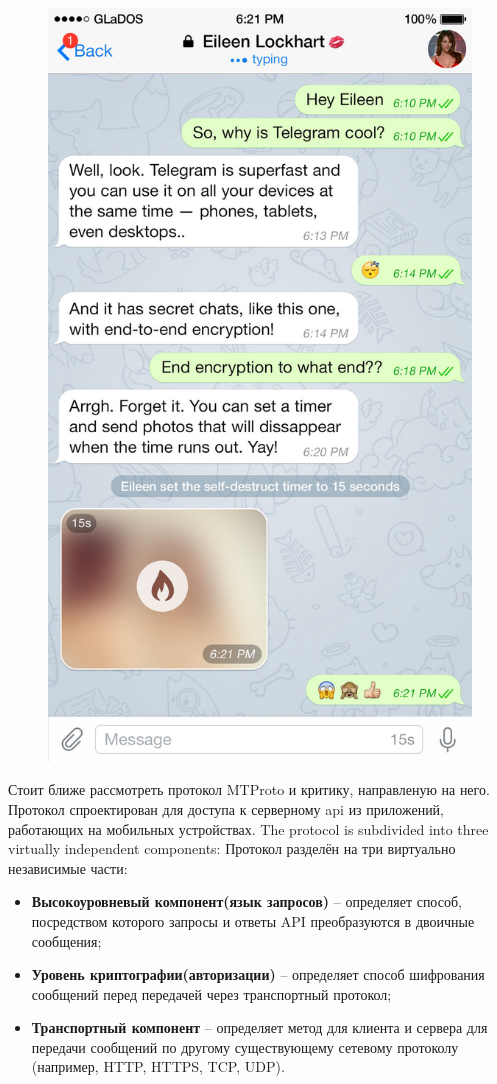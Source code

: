 \begin{figure}[h]
\begin{minipage}{.5\textwidth}
  \label{sec:analysis:research:analogs:telegram:dialogues}
\end{minipage}%
\begin{minipage}{.5\textwidth}
  \centering
  \includegraphics[width=.8\linewidth]{inc/img/tg-secretchat.jpg}
  \label{sec:analysis:research:analogs:telegram:secretchat}
\end{minipage}
\end{figure}

Стоит ближе рассмотреть протокол MTProto и критику, направленую на него. Протокол спроектирован для доступа к серверному \gls{api} из приложений, работающих на мобильных устройствах. 
The protocol is subdivided into three virtually independent components:
Протокол разделён на три виртуально независимые части: 
\begin{itemize}
	\item \textbf{Высокоуровневый компонент(язык запросов)} -- определяет способ, посредством которого запросы и ответы API преобразуются в двоичные сообщения;
	\item \textbf{Уровень криптографии(авторизации)} -- определяет способ шифрования сообщений перед передачей через транспортный протокол;
	\item \textbf{Транспортный компонент} -- определяет метод для клиента и сервера для передачи сообщений по другому существующему сетевому протоколу (например, HTTP, HTTPS, TCP, UDP).
\end{itemize}

